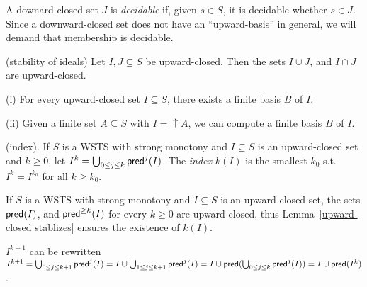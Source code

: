A downard-closed set $J$ is {\em decidable} if, given $s \in S$, it is decidable whether
$s \in J$. 
Since a downward-closed set does not have an ``upward-basis'' in general, we will demand that membership is decidable.

\begin{claim}{(stability of ideals)}
Let $I, J \subseteq S$ be upward-closed. Then the sets $I \cup J$, and $I \cap J$ are upward-closed.
\end{claim}



\begin{fact}\label{fact basis}


(i) For every upward-closed set $I \subseteq S$, there exists a finite basis $B$ of $I$. 

(ii) Given a finite set $A \subseteq S$ with $I =\uparrow A$, we can compute a finite basis $B$ of $I$.

\end{fact}


\begin{definition}{ (index)}. 
If $S$ is a WSTS with strong monotony and $I \subseteq S$  is an upward-closed set and $k \geq 0$, let $I^k= \bigcup_{0 \leq j \leq k} \textsf{pred}^j(I)$.
The {\em index} $k(I)$ is the
smallest $k_0$ s.t. $I^k = I^{k_0}$ for all $k \geq k_0$.
\end{definition}


If $S$ is a WSTS with strong monotony and $I \subseteq S$ is an upward-closed set, the sets $\textsf{pred}(I )$, and $\textsf{pred}^{\geq k}(I )$ for
every $k \geq 0$ are upward-closed, thus Lemma~\ref{upward-closed stablizes} ensures the existence of $k(I)$.

\begin{remark}
$I^{k+1} $ can be rewritten $I^{k+1}= \bigcup_{0 \leq j \leq k+1} \textsf{pred}^j(I) = 
I \cup \bigcup_{1 \leq j \leq k+1} \textsf{pred}^j(I) =
I \cup \textsf{pred}(\bigcup_{0 \leq j \leq k} \textsf{pred}^j(I))
=  I \cup \textsf{pred}(I^k)$.
\end{remark}

